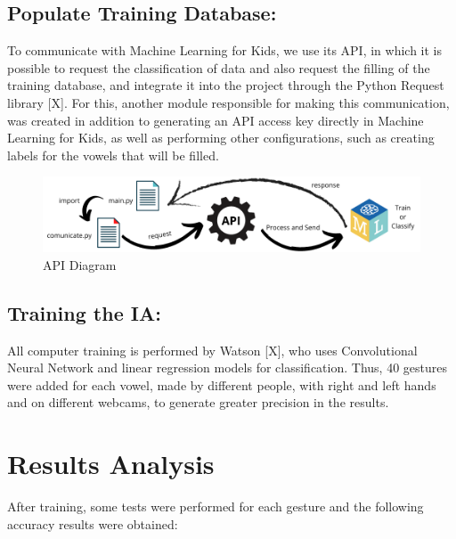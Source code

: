 \documentclass[a4paper, 12pt]{article}
\begin{document}
\subsection{Populate Training Database:}
To communicate with Machine Learning for Kids, we use its API, in which it is possible to request the classification of data and also request the filling of the training database, and integrate it into the project through the Python Request library [X]. For this, another module responsible for making this communication, was created in addition to generating an API access key directly in Machine Learning for Kids, as well as performing other configurations, such as creating labels for the vowels that will be filled.

 \begin{figure}[!ht]
\centering
\includegraphics[scale=0.5]{img/api_diagram.png}
\caption{API Diagram}
\label{figure_5}
\end{figure}





\subsection{Training the IA:}
All computer training is performed by Watson [X], who uses Convolutional Neural Network and linear regression models for classification. Thus, 40 gestures were added for each vowel, made by different people, with right and left hands and on different webcams, to generate greater precision in the results.



\section{Results Analysis}

After training, some tests were performed for each gesture and the following accuracy results were obtained:
\end{document}
